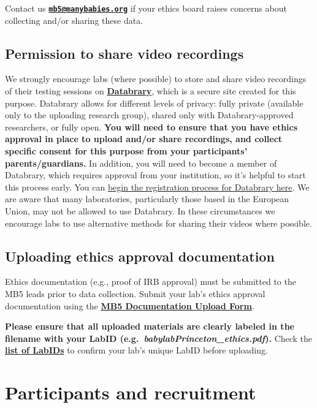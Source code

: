 \documentclass[
]{book}
\begin{document}
Contact us \textbf{\href{mailto:mb5@manybabies.org}{\nolinkurl{mb5@manybabies.org}}} if your ethics board raises concerns about collecting and/or sharing these data.

\subsection{Permission to share video recordings}\label{permission-to-share-video-recordings}

We strongly encourage labs (where possible) to store and share video recordings of their testing sessions on \textbf{\href{https://nyu.databrary.org/}{Databrary}}, which is a secure site created for this purpose. Databrary allows for different levels of privacy: fully private (available only to the uploading research group), shared only with Databrary-approved researchers, or fully open. \textbf{You will need to ensure that you have ethics approval in place to upload and/or share recordings, and collect specific consent for this purpose from your participants' parents/guardians.} In addition, you will need to become a member of Databrary, which requires approval from your institution, so it's helpful to start this process early. You can \href{https://nyu.databrary.org/user/register?page=create}{begin the registration process for Databrary here}. We are aware that many laboratories, particularly those based in the European Union, may not be allowed to use Databrary. In these circumstances we encourage labs to use alternative methods for sharing their videos where possible.

\subsection{Uploading ethics approval documentation}\label{ethics-upload}

Ethics documentation (e.g., proof of IRB approval) must be submitted to the MB5 leads prior to data collection. Submit your lab's ethics approval documentation using the \textbf{\href{https://docs.google.com/forms/d/e/1FAIpQLScTTmcQl1P1F4UWe95Jo7u5bken40AyAefXCYUJ9iYbnWaG8Q/viewform?usp=sf_link}{MB5 Documentation Upload Form}}.

\textbf{Please ensure that all uploaded materials are clearly labeled in the filename with your LabID (e.g.~\emph{babylabPrinceton\_ethics.pdf}).} Check the \textbf{\href{https://manybabies.org/labids/}{list of LabIDs}} to confirm your lab's unique LabID before uploading.

\section{Participants and recruitment}\label{participants-and-recruitment}
\end{document}
